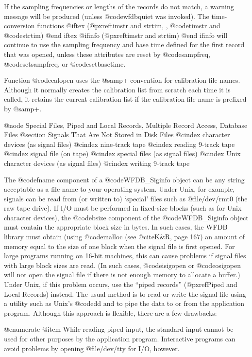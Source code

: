 {{{{{{{{{{If the sampling frequencies or lengths of the records do not match, a warning
message will be produced (unless @code{wfdbquiet} was invoked).  The
time-conversion functions
@iftex
(@pxref{timstr and strtim, , @code{timstr} and @code{strtim}})
@end iftex
@ifinfo
(@pxref{timstr and strtim})
@end ifinfo
will continue to use the sampling frequency and base
time defined for the first record that was opened, unless these
attributes are reset by @code{sampfreq}, @code{setsampfreq}, or
@code{setbasetime}.

Function @code{calopen} uses the @samp{+} convention for calibration
file names.  Although it normally creates the calibration list from
scratch each time it is called, it retains the current calibration list
if the calibration file name is prefixed by @samp{+}.

@node     Special Files, Piped and Local Records, Multiple Record Access, Database Files
@section Signals That Are Not Stored in Disk Files
@cindex character devices (as signal files)
@cindex nine-track tape
@cindex reading 9-track tape
@cindex signal file (on tape)
@cindex special files (as signal files)
@cindex Unix character devices (as signal files)
@cindex writing 9-track tape

The @code{fname} component of a @code{WFDB_Siginfo} object can be any
string acceptable as a file name to your operating system.  Under Unix,
for example, signals can be read from (or written to) `special' files
such as @file{/dev/rmt0} (the raw tape drive).  If I/O must be performed
in fixed-size blocks (such as for Unix character devices), the
@code{bsize} component of the @code{WFDB_Siginfo} object must contain the
appropriate block size in bytes.  In such cases, the WFDB library must
obtain (using @code{malloc} (see @cite{K&R}, page 167) an amount of
memory equal to the size of one block when the signal file is first
opened.  For large programs running on 16-bit machines, this can cause
problems if signal files with large block sizes are read.  (In such
cases, @code{isigopen} or @code{osigopen} will not open the signal file
if there is not enough memory to allocate a buffer.)  Under Unix, if
this problem occurs, use the ``piped records'' (@pxref{Piped and Local
Records}) instead.  The usual method is to read or write the signal file
using a utility such as Unix's @code{dd} and to pipe the data to or from
the application program.  Although this approach is flexible, there are
a few drawbacks:

@enumerate
@item
While reading piped input, the standard input cannot be used for other
purposes by the application program.  Interactive programs can avoid
problems by opening @file{/dev/tty} for I/O, however.

}}}}}}}}}}
